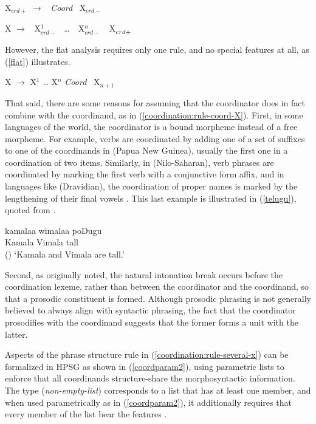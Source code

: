 \eal
\label{ok}
\ex\label{coordination:rule-coord-X} 
X$_{crd+}$ $\rightarrow$ \, \emph{Coord} \, X$_{crd-}$
 
\ex\label{coordination:rule-several-x} 
X $\rightarrow$ \, X$^1_{crd-}$  \, \ldots{} \,\, X$^n_{crd-}$ \,\, X$^{\vphantom{n}}_{crd+}$
\zl

\noindent
However, the flat analysis requires only one rule, and no
special features at all, as (\ref{flat}) illustrates. 

\ea
\label{flat}
X  $\rightarrow$ X$^1$ \ldots{} X$^n$ \emph{Coord} \, X$_{n+1}$
\z

That said, there are some reasons for assuming that the coordinator does in fact combine with the
coordinand, as in (\ref{coordination:rule-coord-X}). First, in some languages of the world, the
coordinator is a bound morpheme instead of a free morpheme. For example, verbs are coordinated by
adding one of a set of suffixes to one of the coordinands in  (Papua New Guinea),
usually the first one in a coordination of two items.
Similarly, in  (Nilo-Saharan), verb phrases are coordinated by marking the first verb
with a conjunctive form affix, and in languages like  (Dravidian), the coordination of
proper names is marked by the lengthening of their final vowels \citep[]{Drellishak:Bender:05}. This last example is illustrated in (\ref{telugu}), quoted from
.

\ea
\label{telugu}
\gll kamalaa wimalaa poDugu \\ 
     Kamala Vimala tall\\\hfill()
\glt `Kamala and Vimala are tall.'
\z

Second, as \citet[165]{ross67} originally noted, the natural intonation break occurs before the
coordination lexeme, rather than between the coordinator and the coordinand, so that a  prosodic
constituent is formed. Although prosodic phrasing is not generally believed to always align with
syntactic phrasing, the fact that the coordinator prosodifies with the  coordinand suggests that the
former forms a unit with the latter. 

Aspects of the phrase structure rule in (\ref{coordination:rule-several-x}) can be formalized in
HPSG as shown in (\ref{coordparam2}), using parametric lists \citep[, fn.\,2]{pollardsag}
to enforce that all coordinands structure-share the morphosyntactic information. The type
 (\textit{non-empty-list}) corresponds to a list that has at least one member, and
when used parametrically as in (\ref{coordparam2}), it additionally requires that every member of
the list bear the features .

